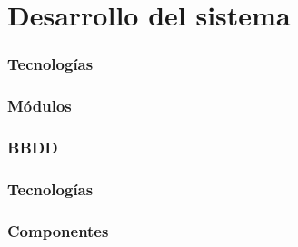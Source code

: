 \chapter{Desarrollo del sistema}
\label{chap:desarrollosistema}
\subsection{Tecnologías}
\subsection{Módulos}
\subsection{BBDD}
\subsection{Tecnologías}
\subsection{Componentes}

